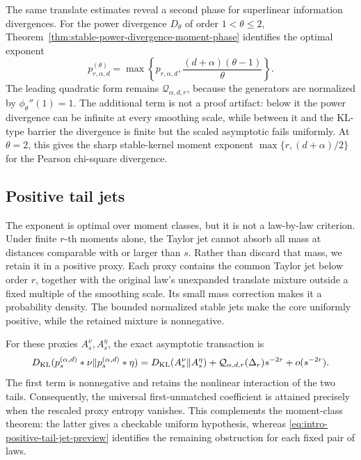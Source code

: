 The same translate estimates reveal a second phase for superlinear
information divergences.  For the power divergence \(D_\theta\) of order
\(1<\theta\le2\), Theorem~\ref{thm:stable-power-divergence-moment-phase}
identifies the optimal exponent
\[
 p_{r,\alpha,d}^{(\theta)}
 =\max\left\{p_{r,\alpha,d},
 \frac{(d+\alpha)(\theta-1)}\theta\right\}.
\]
The leading quadratic form remains
\(\mathcal Q_{\alpha,d,r}\), because the generators are normalized by
\(\phi_\theta''(1)=1\).  The additional term is not a proof artifact:
below it the power divergence can be infinite at every smoothing scale,
while between it and the KL-type barrier the divergence is finite but the
scaled asymptotic fails uniformly.  At \(\theta=2\), this gives the sharp
stable-kernel moment exponent
\(\max\{r,(d+\alpha)/2\}\) for the Pearson chi-square divergence.

\subsection*{Positive tail jets}

The exponent is optimal over moment classes, but it is not a law-by-law
criterion.  Under finite \(r\)-th moments alone, the Taylor jet
cannot absorb all mass at distances comparable with or larger than \(s\).
Rather than discard that mass, we retain it in a positive proxy.  Each proxy
contains the common Taylor jet below order \(r\), together with the original
law's unexpanded translate mixture outside a fixed multiple of the smoothing
scale.  Its small mass correction makes it a probability density.  The
bounded normalized stable jets make the core uniformly positive, while the
retained mixture is nonnegative.

For these proxies \(A_s^\nu,A_s^\eta\), the exact asymptotic transaction is
\begin{equation}\label{eq:intro-positive-tail-jet-preview}
 D_{\rm KL}(p_s^{(\alpha,d)}*\nu\|p_s^{(\alpha,d)}*\eta)
 =D_{\rm KL}(A_s^\nu\|A_s^\eta)
  +\mathcal Q_{\alpha,d,r}(\Delta_r)s^{-2r}+o(s^{-2r}).
\end{equation}
The first term is nonnegative and retains the nonlinear interaction of the
two tails.  Consequently, the universal first-unmatched coefficient is
attained precisely when the rescaled proxy entropy vanishes.  This
complements the moment-class theorem: the latter gives a checkable uniform
hypothesis, whereas \eqref{eq:intro-positive-tail-jet-preview} identifies the
remaining obstruction for each fixed pair of laws.

